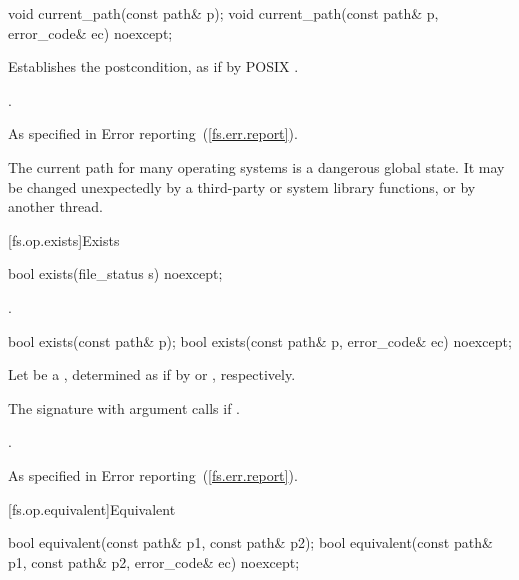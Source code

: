 %
\begin{itemdecl}
void current_path(const path& p);
void current_path(const path& p, error_code& ec) noexcept;
\end{itemdecl}

\begin{itemdescr}
\pnum
\effects Establishes the postcondition, as if by POSIX .

\pnum
\postcondition {}.

\pnum
\throws As specified in Error reporting~(\ref{fs.err.report}).

\pnum
\begin{note} The current path for many operating systems is a dangerous
  global state. It may be changed unexpectedly by a third-party or system
  library functions, or by another thread. \end{note}
\end{itemdescr}

[fs.op.exists]{Exists}

%
\begin{itemdecl}
bool exists(file_status s) noexcept;
\end{itemdecl}

\begin{itemdescr}
\pnum
\returns {}.
\end{itemdescr}

%
\begin{itemdecl}
bool exists(const path& p);
bool exists(const path& p, error_code& ec) noexcept;
\end{itemdecl}

\begin{itemdescr}
\pnum
Let  be a ,
determined as if by  or , respectively.

\pnum
\effects The signature with argument  calls 
if .

\pnum
\returns {}.

\pnum
\throws As specified in Error reporting~(\ref{fs.err.report}).
\end{itemdescr}


[fs.op.equivalent]{Equivalent}

%
\begin{itemdecl}
bool equivalent(const path& p1, const path& p2);
bool equivalent(const path& p1, const path& p2, error_code& ec) noexcept;
\end{itemdecl}

